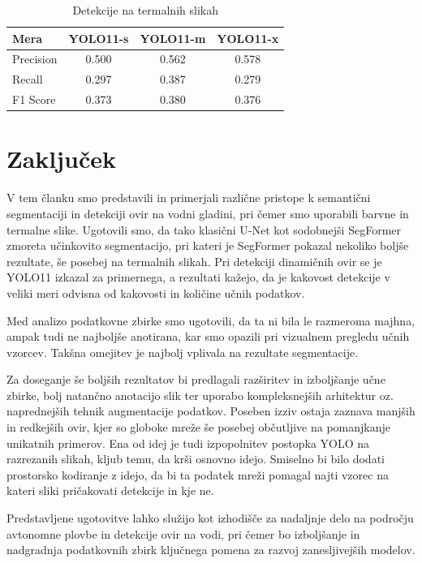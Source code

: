 \documentclass[10pt,twocolumn,letterpaper]{article}
\begin{document}
\begin{table}[h]
    \begin{center}
        \begin{tabular}{|l|c|c|c|}
            \hline
                Mera & YOLO11-s & YOLO11-m & YOLO11-x \\
            \hline\hline
                Precision & 0.500 & 0.562 & 0.578 \\
                Recall & 0.297 & 0.387 & 0.279 \\
                F1 Score & 0.373 & 0.380 & 0.376 \\
            \hline
        \end{tabular}
    \end{center}
    \caption{Detekcije na termalnih slikah}
    \label{tab:rezultati_detekcija_thermal}
\end{table}


 
\section{Zaključek}
V tem članku smo predstavili in primerjali različne pristope k semantični segmentaciji in detekciji ovir na vodni gladini, pri čemer smo uporabili barvne in termalne slike. Ugotovili smo, da tako klasični U-Net kot sodobnejši SegFormer zmoreta učinkovito segmentacijo, pri kateri je SegFormer pokazal nekoliko boljše rezultate, še posebej na termalnih slikah. Pri detekciji dinamičnih ovir se je YOLO11 izkazal za primernega, a rezultati kažejo, da je kakovost detekcije v veliki meri odvisna od kakovosti in količine učnih podatkov.

Med analizo podatkovne zbirke smo ugotovili, da ta ni bila le razmeroma majhna, ampak tudi ne najboljše anotirana, kar smo opazili pri vizualnem pregledu učnih vzorcev. Takšna omejitev je najbolj vplivala na rezultate segmentacije.

Za doseganje še boljših rezultatov bi predlagali razširitev in izboljšanje učne zbirke, bolj natančno anotacijo slik ter uporabo kompleksnejših arhitektur oz. naprednejših tehnik augmentacije podatkov. Poseben izziv ostaja zaznava manjših in redkejših ovir, kjer so globoke mreže še posebej občutljive na pomanjkanje unikatnih primerov. Ena od idej je tudi izpopolnitev postopka YOLO na razrezanih slikah, kljub temu, da krši osnovno idejo. Smiselno bi bilo dodati prostorsko kodiranje z idejo, da bi ta podatek mreži pomagal najti vzorec na kateri sliki pričakovati detekcije in kje ne.

Predstavljene ugotovitve lahko služijo kot izhodišče za nadaljnje delo na področju avtonomne plovbe in detekcije ovir na vodi, pri čemer bo izboljšanje in nadgradnja podatkovnih zbirk ključnega pomena za razvoj zanesljivejših modelov.

{\small


}
\end{document}
